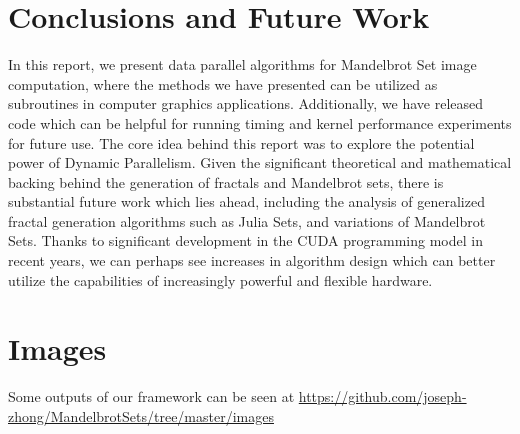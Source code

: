 \documentclass[letterpaper]{article}
\begin{document}
\begin{multicols}{2}
  \section{Conclusions and Future Work}

In this report, we present data parallel algorithms for Mandelbrot Set image
  computation, where the methods we have presented can be utilized as
  subroutines in computer graphics applications. Additionally, we have released
  code which can be helpful for running timing and kernel performance
  experiments for future use. The core idea behind this report was to explore
  the potential power of Dynamic Parallelism. 
Given the significant theoretical and mathematical backing behind the generation 
  of fractals and Mandelbrot sets, there is substantial future work which lies 
  ahead, including the analysis of generalized fractal generation algorithms
  such as Julia Sets, and variations of Mandelbrot Sets. 
Thanks to significant development in the CUDA programming model in recent years,
  we can perhaps see increases in algorithm design which can better utilize the
  capabilities of increasingly powerful and flexible hardware. 

\section{Images}

Some outputs of our framework can be seen at 
\url{https://github.com/joseph-zhong/MandelbrotSets/tree/master/images}

\end{multicols}
\end{document}
